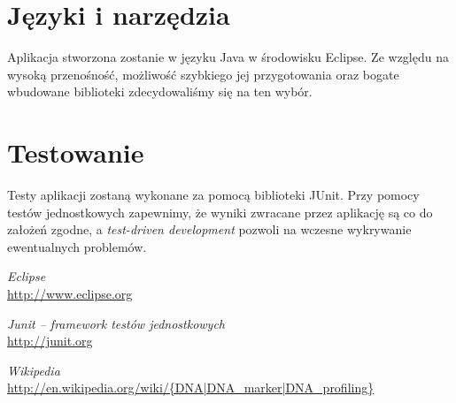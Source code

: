 \documentclass[11pt,a4paper]{article}
\begin{document}
\section{Języki i narzędzia}
Aplikacja stworzona zostanie w języku Java w środowisku Eclipse\cite{eclipse}. Ze względu na wysoką przenośność, możliwość szybkiego jej przygotowania oraz bogate wbudowane biblioteki zdecydowaliśmy się na ten wybór.

\section{Testowanie}
Testy aplikacji zostaną wykonane za pomocą biblioteki JUnit\cite{junit}. Przy pomocy testów jednostkowych zapewnimy, że wyniki zwracane przez aplikację są co do założeń zgodne, a \emph{test-driven development} pozwoli na wczesne wykrywanie ewentualnych problemów.

\begin{thebibliography}{9}

	\emph{Eclipse}\\
	\url{http://www.eclipse.org}

	\emph{Junit -- framework testów jednostkowych}\\
	\url{http://junit.org}

	\emph{Wikipedia}\\
	\url{http://en.wikipedia.org/wiki/{DNA|DNA_marker|DNA_profiling}}
\end{thebibliography}
\end{document}

